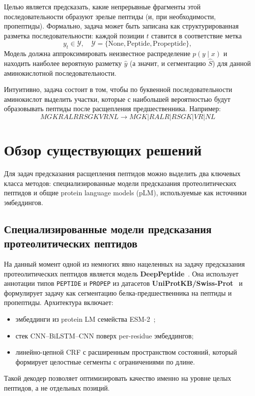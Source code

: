 \documentclass{article}
\begin{document}
Целью является предсказать, какие непрерывные фрагменты этой последовательности
образуют зрелые пептиды (и, при необходимости, пропептиды). Формально,
задача может быть записана как структурированная разметка
последовательности: каждой позиции $t$ ставится в соответствие метка
$$
  y_t \in \mathcal{Y}, \quad \mathcal{Y} = \{\text{None}, \text{Peptide}, \text{Propeptide}\},
$$
Модель должна аппроксимировать неизвестное распределение $p(y \mid x)$ и находить
наиболее вероятную разметку $\hat{y}$ (а значит, и сегментацию $\hat{S}$) для данной
аминокислотной последовательности.

Интуитивно, задача состоит в том, чтобы по буквенной последовательности аминокислот
выделить участки, которые с наибольшей вероятностью будут образовывать пептиды после
расщепления предшественника. Например:
$$
  MGKRALRRSGKVRNL \rightarrow MGK | RALR | RSGK | VR | NL
$$

\section{Обзор существующих решений}

Для задач предсказания расщепления пептидов можно выделить два ключевых класса методов: специализированные модели предсказания протеолитических пептидов и общие protein language models (pLM), используемые как источники эмбеддингов.

\subsection{Специализированные модели предсказания протеолитических пептидов}

На данный момент одной из немногих явно нацеленных на задачу предсказания протеолитических пептидов  является модель \textbf{DeepPeptide}~\cite{deeppeptide2023}. Она использует аннотации типов \texttt{PEPTIDE} и \texttt{PROPEP} из датасетов \textbf{UniProtKB/Swiss-Prot}~\cite{uniprot2025} и формулирует задачу как сегментацию белка-предшественника на пептиды и пропептиды. Архитектура включает:
\begin{itemize}
    \item эмбеддинги из protein LM семейства ESM-2~\cite{ESM-family};
    \item стек CNN--BiLSTM--CNN поверх per-residue эмбеддингов;
    \item линейно-цепной CRF с расширенным пространством состояний, который формирует целостные сегменты с ограничениями по длине.
\end{itemize}
Такой декодер позволяет оптимизировать качество именно на уровне целых пептидов, а не отдельных позиций.
\end{document}
